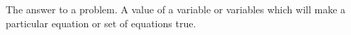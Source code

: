 The answer to a problem. A value of a variable
or variables which will make a particular equation or set
of equations true.